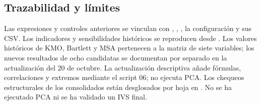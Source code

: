 \subsection{Trazabilidad y límites}

Las expresiones y controles anteriores se vinculan con , , , la configuración  y sus CSV. Los indicadores y sensibilidades históricos se reproducen desde . Los valores históricos de KMO, Bartlett y MSA pertenecen a la matriz de siete variables; los nuevos resultados de ocho candidatas se documentan por separado en la actualización del 20 de octubre. La actualización descriptiva añade fórmulas, correlaciones y extremos mediante el script 06; no ejecuta PCA. Los chequeos estructurales de los consolidados están desglosados por hoja en . No se ha ejecutado PCA ni se ha validado un IVS final.

